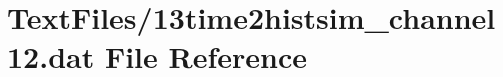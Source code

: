 \hypertarget{13time2histsim__channel12_8dat}{}\section{Text\+Files/13time2histsim\+\_\+channel12.dat File Reference}
\label{13time2histsim__channel12_8dat}
